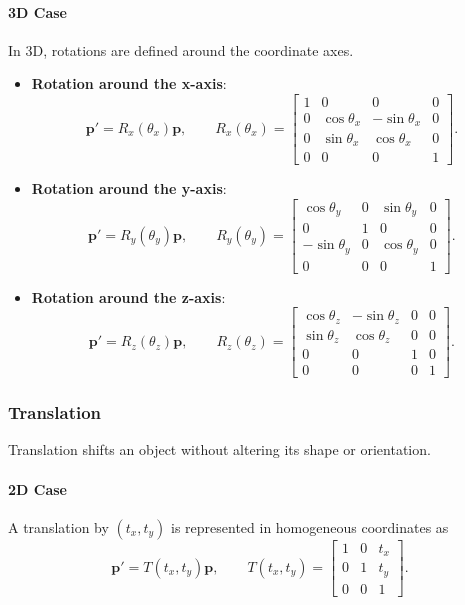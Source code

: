 \paragraph{3D Case}
In 3D, rotations are defined around the coordinate axes.

\begin{itemize}
\item \textbf{Rotation around the x-axis}:
\[
\mathbf{p}' = R_x(\theta_x)\mathbf{p},
\qquad
R_x(\theta_x)=
\begin{bmatrix}
1 & 0 & 0 & 0 \\
0 & \cos\theta_x & -\sin\theta_x & 0 \\
0 & \sin\theta_x & \cos\theta_x & 0 \\
0 & 0 & 0 & 1
\end{bmatrix}.
\]

\item \textbf{Rotation around the y-axis}:
\[
\mathbf{p}' = R_y(\theta_y)\mathbf{p},
\qquad
R_y(\theta_y)=
\begin{bmatrix}
\cos\theta_y & 0 & \sin\theta_y & 0 \\
0 & 1 & 0 & 0 \\
-\sin\theta_y & 0 & \cos\theta_y & 0 \\
0 & 0 & 0 & 1
\end{bmatrix}.
\]

\item \textbf{Rotation around the z-axis}:
\[
\mathbf{p}' = R_z(\theta_z)\mathbf{p},
\qquad
R_z(\theta_z)=
\begin{bmatrix}
\cos\theta_z & -\sin\theta_z & 0 & 0 \\
\sin\theta_z & \cos\theta_z & 0 & 0 \\
0 & 0 & 1 & 0 \\
0 & 0 & 0 & 1
\end{bmatrix}.
\]
\end{itemize}

\subsubsection{Translation}
Translation shifts an object without altering its shape or orientation.

\paragraph{2D Case}
A translation by $(t_x,t_y)$ is represented in homogeneous coordinates as
\[
\mathbf{p}' = T(t_x,t_y)\mathbf{p},
\qquad
T(t_x,t_y)=
\begin{bmatrix}
1 & 0 & t_x \\
0 & 1 & t_y \\
0 & 0 & 1
\end{bmatrix}.
\]


